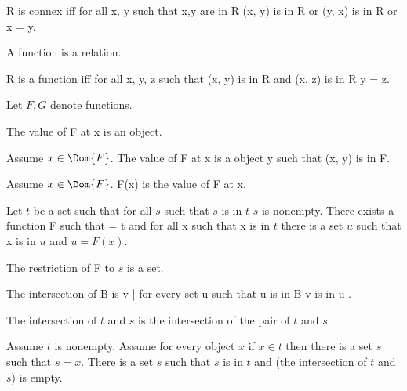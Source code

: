 \documentclass{article}
\begin{document}
\begin{forthel}
    \begin{definition}
      R is connex iff for all x, y such that x,y are in R
        (x, y) is in R or (y, x) is in R or x = y.
    \end{definition}

    \begin{signature}
      A function is a relation.
    \end{signature}

    \begin{axiom}[FunctionIntro]
      R is a function iff for all x, y, z such that (x, y) is in R and (x, z) is in R y = z.
    \end{axiom}

    Let $F, G$ denote functions.

    \begin{signature}
      The value of F at x is an object.
    \end{signature}

    \begin{axiom}
      Assume $x \in \Dom{F}$.
      The value of F at x is a object y such that (x, y) is in F.
    \end{axiom}

    \begin{definition}
      Assume $x \in \Dom{F}$.
      F(x) is the value of F at x.
    \end{definition}

    \begin{axiom}[Choice]
      Let $t$ be a set such that for all $s$ such that $s$ is in $t$ $s$ is nonempty.
        There exists a function F such that  = t
        and for all x such that x is in $t$ there is a set $u$ such that x is in $u$ and $u = F(x)$.
    \end{axiom}

    \begin{axiom}[Replacement]
      The restriction of F to $s$ is a set.
    \end{axiom}

    \begin{definition}
      The intersection of B is { v | for every set u such that u is in B v is in u }.
    \end{definition}

    \begin{definition}
      The intersection of $t$ and $s$ is the intersection of the pair of $t$ and $s$.
    \end{definition}

    \begin{axiom}[Foundation]
      Assume $t$ is nonempty.
      Assume for every object $x$ if $x \in t$
        then there is a set $s$ such that $s = x$.
      There is a set $s$ such that $s$ is in $t$ and
         (the intersection of $t$ and $s$) is empty.
    \end{axiom}
  \end{forthel}
\end{document}
